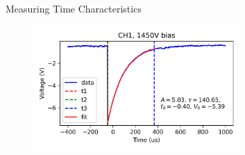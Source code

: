\begin{frame}{Measuring Time Characteristics}
    \begin{figure}
        \centering
        \includegraphics[width=0.7\textwidth]{images/example_time_fitting.png}
    \end{figure}
\end{frame}

